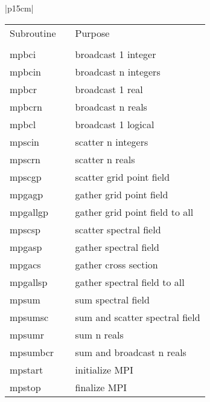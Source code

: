 \begin{center}
\begin{tabular}{|p{15cm}|}
\begin{center}
\begin{tabular}{l p{2cm} l}
Subroutine & &Purpose \\
&& \\
{\sub mpbci} && broadcast 1 integer \\
{\sub mpbcin} & &broadcast n integers \\
{\sub mpbcr} & &broadcast 1 real \\
{\sub mpbcrn} & &broadcast n reals \\
{\sub mpbcl} && broadcast 1 logical \\
{\sub mpscin} & &scatter n integers \\
{\sub mpscrn} && scatter n reals \\
{\sub mpscgp} && scatter grid point field \\
{\sub mpgagp} && gather grid point field \\
{\sub mpgallgp} && gather grid point field to all \\
{\sub mpscsp} & &scatter spectral field \\
{\sub mpgasp} && gather spectral field \\
{\sub mpgacs} && gather cross section \\
{\sub mpgallsp} && gather spectral field to all \\
{\sub mpsum} && sum spectral field \\
{\sub mpsumsc} && sum and scatter spectral field \\
{\sub mpsumr} && sum n reals \\
{\sub mpsumbcr}& & sum and broadcast n reals \\
{\sub mpstart} & &initialize MPI \\
{\sub mpstop} & &finalize MPI \\
\end{tabular}
\end{center}
\vspace{3mm} \\
\hline
\end{tabular}
\end{center}

\newpage

